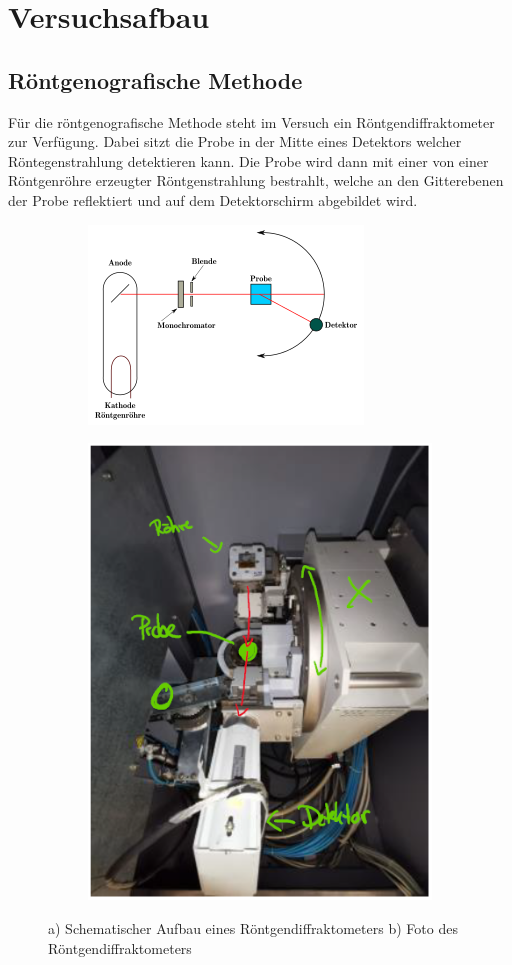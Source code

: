 \section{Versuchsafbau}
    \subsection*{Röntgenografische Methode}
    Für die röntgenografische Methode steht im Versuch ein Röntgendiffraktometer zur Verfügung.
    Dabei sitzt die Probe in der Mitte eines Detektors welcher Röntegenstrahlung detektieren kann.
    Die Probe wird dann mit einer von einer Röntgenröhre erzeugter Röntgenstrahlung bestrahlt, welche
    an den Gitterebenen der Probe reflektiert und auf dem Detektorschirm abgebildet wird.
    \begin{figure}[H]
        \centering
        \begin{subfigure}{.5\textwidth}
        \centering
        \includegraphics[width=.8\linewidth]{images/diffraktometer.png}
        \caption{}
        \label{fig:sub1}
        \end{subfigure}%
        \begin{subfigure}{.5\textwidth}
        \centering
        \includegraphics[width=.6\linewidth]{images/diffraktometer_pic.png}
        \caption{}
        \label{fig:sub2}
        \end{subfigure}
        \caption{a) Schematischer Aufbau eines Röntgendiffraktometers b) Foto des Röntgendiffraktometers}
        \label{fig:test}
    \end{figure}
